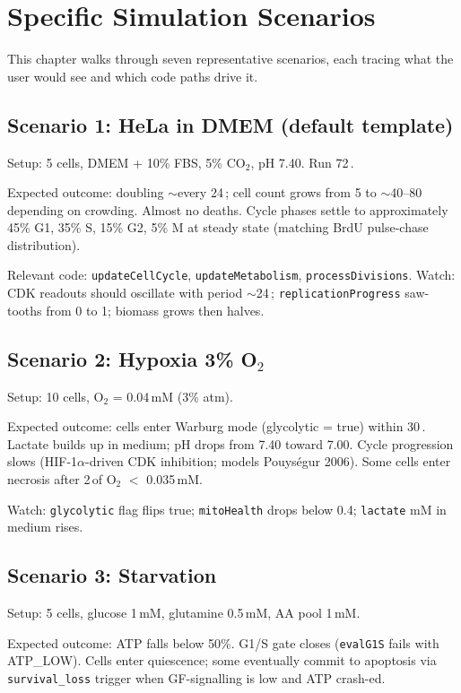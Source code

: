\documentclass[11pt,letterpaper,twoside,openany]{book}
\newcommand{\code}[1]{\texttt{#1}}
\newcommand{\bioh}{\text{bio-h}}
\newcommand{\biomin}{\text{bio-min}}
\begin{document}
\chapter{Specific Simulation Scenarios}
\label{ch:scenarios}

This chapter walks through seven representative scenarios, each
tracing what the user would see and which code paths drive it.

\section{Scenario 1: HeLa in DMEM (default template)}

Setup: 5 cells, DMEM + 10\% FBS, 5\% CO$_2$, pH 7.40. Run 72\,\bioh.

Expected outcome: doubling $\sim$every 24\,\bioh; cell count grows
from 5 to $\sim$40--80 depending on crowding. Almost no deaths.
Cycle phases settle to approximately 45\% G1, 35\% S, 15\% G2, 5\% M
at steady state (matching BrdU pulse-chase distribution).

Relevant code: \code{updateCellCycle}, \code{updateMetabolism},
\code{processDivisions}. Watch: CDK readouts should oscillate with
period $\sim$24\,\bioh; \code{replicationProgress} saw-tooths from 0
to 1; biomass grows then halves.

\section{Scenario 2: Hypoxia 3\% O$_2$}

Setup: 10 cells, O$_2$ = 0.04\,mM (3\% atm).

Expected outcome: cells enter Warburg mode (glycolytic = true)
within 30\,\biomin. Lactate builds up in medium; pH drops from 7.40
toward 7.00. Cycle progression slows (HIF-1$\alpha$-driven CDK
inhibition; models Pouys{\'e}gur 2006). Some cells enter necrosis
after 2\,\bioh of O$_2$ $<$ 0.035\,mM.

Watch: \code{glycolytic} flag flips true; \code{mitoHealth} drops
below 0.4; \code{lactate} mM in medium rises.

\section{Scenario 3: Starvation}

Setup: 5 cells, glucose 1\,mM, glutamine 0.5\,mM, AA pool 1\,mM.

Expected outcome: ATP falls below 50\%. G1/S gate closes
(\code{evalG1S} fails with ATP\_LOW). Cells enter quiescence; some
eventually commit to apoptosis via \code{survival\_loss} trigger
when GF-signalling is low and ATP crash-ed.
\end{document}
